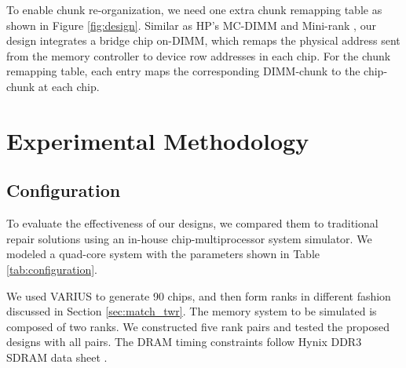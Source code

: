 To enable chunk re-organization, we need one extra chunk remapping table as shown in Figure \ref{fig:design}. Similar as HP's MC-DIMM \cite{SC09:mcdimm} and Mini-rank \cite{MICRO08:minirank}, our design integrates a bridge chip on-DIMM, which remaps the physical address sent from the memory controller to device row addresses in each chip. For the chunk remapping table, each entry maps the corresponding DIMM-chunk to the chip-chunk at each chip.  


\section{Experimental Methodology}
\subsection{Configuration}
To evaluate the effectiveness of our designs, we compared them to traditional repair solutions using an in-house chip-multiprocessor system simulator. We modeled a quad-core system with the parameters shown in Table \ref{tab:configuration}. 

We used VARIUS to generate 90 chips, and then form ranks in different fashion discussed in Section \ref{sec:match_twr}. The memory system to be simulated is composed of two ranks. We constructed five rank pairs and tested the proposed designs with all pairs.
The DRAM timing constraints follow Hynix DDR3 SDRAM data sheet \cite{hynix:ddr3}. 

